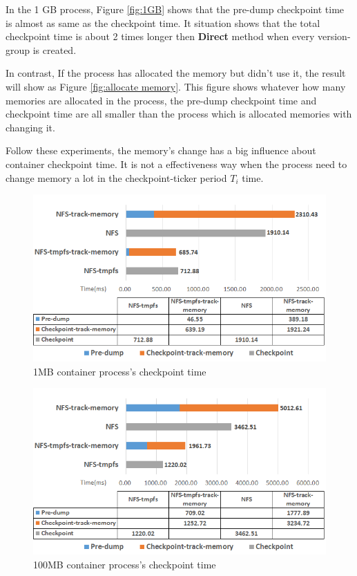 In the 1 GB process, Figure \ref{fig:1GB} shows that the pre-dump checkpoint time is almost as same as the checkpoint time. It situation shows that the total checkpoint time is about 2 times longer then \textbf{Direct} method when every version-group is created.

In contrast, If the process has allocated the memory but didn't use it, the result will show as Figure \ref{fig:allocate memory}. This figure shows whatever how many memories are allocated in the process, the pre-dump checkpoint time and checkpoint time are all smaller than the process which is allocated memories with changing it.

Follow these experiments, the memory's change has a big influence about container checkpoint time. It is not a effectiveness way when the process need to change memory a lot in the checkpoint-ticker period $ T_i $ time.

\begin{figure}[htbp]
\begin{center}
\includegraphics[width=14cm]{figure/1MB.png}
\end{center}
\caption{1MB container process's checkpoint time}
\label{fig:1MB}
\end{figure}

\begin{figure}[htbp]
\begin{center}
\includegraphics[width=14cm]{figure/100MB.png}
\end{center}
\caption{100MB container process's checkpoint time}
\label{fig:100MB}
\end{figure}

